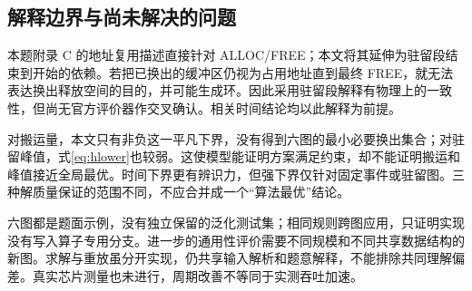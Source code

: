 \subsection{解释边界与尚未解决的问题}
本题附录 C 的地址复用描述直接针对 ALLOC/FREE；本文将其延伸为驻留段结束到开始的依赖。若把已换出的缓冲区仍视为占用地址直到最终 FREE，就无法表达换出释放空间的目的，并可能生成环。因此采用驻留段解释有物理上的一致性，但尚无官方评价器作交叉确认。相关时间结论均以此解释为前提。

对搬运量，本文只有非负这一平凡下界，没有得到六图的最小必要换出集合；对驻留峰值，式\eqref{eq:hlower}也较弱。这使模型能证明方案满足约束，却不能证明搬运和峰值接近全局最优。时间下界更有辨识力，但强下界仅针对固定事件或驻留图。三种解质量保证的范围不同，不应合并成一个“算法最优”结论。

六图都是题面示例，没有独立保留的泛化测试集；相同规则跨图应用，只证明实现没有写入算子专用分支。进一步的通用性评价需要不同规模和不同共享数据结构的新图。求解与重放虽分开实现，仍共享输入解析和题意解释，不能排除共同理解偏差。真实芯片测量也未进行，周期改善不等同于实测吞吐加速。
